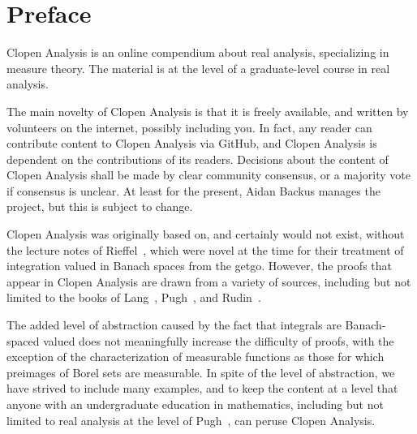 \chapter*{Preface}
Clopen Analysis is an online compendium about real analysis, specializing in measure theory.
The material is at the level of a graduate-level course in real analysis.

The main novelty of Clopen Analysis is that it is freely available, and written by volunteers on the internet, possibly including you.
In fact, any reader can contribute content to Clopen Analysis via GitHub, and Clopen Analysis is dependent on the contributions of its readers.
Decisions about the content of Clopen Analysis shall be made by clear community consensus, or a majority vote if consensus is unclear.
At least for the present, Aidan Backus manages the project, but this is subject to change.

Clopen Analysis was originally based on, and certainly would not exist, without the lecture notes of Rieffel~\cite{Rieffel1970}, which were novel at the time for their treatment of integration valued in Banach spaces from the getgo.
However, the proofs that appear in Clopen Analysis are drawn from a variety of sources, including but not limited to the books of Lang~\cite{lang2012real}, Pugh~\cite{pugh2013real}, and Rudin~\cite{rudin1978real}.

The added level of abstraction caused by the fact that integrals are Banach-spaced valued does not meaningfully increase the difficulty of proofs, with the exception of the characterization of measurable functions as those for which preimages of Borel sets are measurable.
In spite of the level of abstraction, we have strived to include many examples, and to keep the content at a level that anyone with an undergraduate education in mathematics, including but not limited to real analysis at the level of Pugh~\cite{pugh2013real}, can peruse Clopen Analysis.
\newpage
